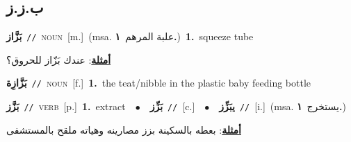 \documentclass[10pt,a4paper,twoside]{article} %
\begin{document}
\begin{multicols}{2}
\vspace{-3mm}
\subsection*{\color{blue}\foreignlanguage{arabic}{ب.ز.ز}\color{blue}{}} 

{\setlength\topsep{0pt}\textbf{\foreignlanguage{arabic}{بَزَّاز}}\ {\color{gray}\texttt{//}\color{black}}\ \textsc{noun}\ [m.]\ \color{gray}(msa. \foreignlanguage{arabic}{علبة المرهم}~\foreignlanguage{arabic}{\textbf{١.}})\color{black}\ \textbf{1.}~squeeze tube\  \begin{flushright}\color{gray}\foreignlanguage{arabic}{\textbf{\underline{\foreignlanguage{arabic}{أمثلة}}}: عندك بَزّاز للحروق؟}\end{flushright}\color{black}} \vspace{2mm}

{\setlength\topsep{0pt}\textbf{\foreignlanguage{arabic}{بَزَّازِة}}\ {\color{gray}\texttt{//}\color{black}}\ \textsc{noun}\ [f.]\ \textbf{1.}~the teat/nibble in the plastic baby feeding bottle\ } \vspace{2mm}

{\setlength\topsep{0pt}\textbf{\foreignlanguage{arabic}{بَزَّز}}\ {\color{gray}\texttt{//}\color{black}}\ \textsc{verb}\ [p.]\ \textbf{1.}~extract\ \ $\bullet$\ \ \setlength\topsep{0pt}\textbf{\foreignlanguage{arabic}{بَزِّز}}\ {\color{gray}\texttt{//}\color{black}}\ [c.]\ \ $\bullet$\ \ \setlength\topsep{0pt}\textbf{\foreignlanguage{arabic}{يبَزِّز}}\ {\color{gray}\texttt{//}\color{black}}\ [i.]\ \color{gray}(msa. \foreignlanguage{arabic}{يستخرج}~\foreignlanguage{arabic}{\textbf{١.}})\color{black}\  \begin{flushright}\color{gray}\foreignlanguage{arabic}{\textbf{\underline{\foreignlanguage{arabic}{أمثلة}}}: بعطه بالسكينة بزز مصارينه وهياته ملقح بالمستشفى}\end{flushright}\color{black}} \vspace{2mm}


\end{multicols}
\end{document}
